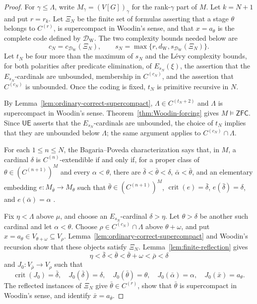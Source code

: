 \documentclass[11pt,a4paper]{amsart}
\newcommand{\ZFC}{\mathsf{ZFC}}
\newcommand{\crit}{\operatorname{crit}}
\newcommand{\UE}{\mathsf{UE}}
\theoremstyle{plain}
\theoremstyle{definition}
\theoremstyle{remark}
\begin{document}
\begin{proof}
For $\gamma\leq\Lambda$, write $M_\gamma=(V[G])_\gamma$ for the rank-$\gamma$ part of $M$.  Let $k=N+1$ and put $r=r_k$.  Let $\Xi_N$ be the finite set of formulas asserting that a stage $\theta$ belongs to $C^{(r)}$, is supercompact in Woodin's sense, and that $x=a_\theta$ is the complete code defined by $\mathcal D_{\mathrm W}$.  The two complexity bounds needed below are
\[
c_N=c_{\mathcal D_{\mathrm W}}(\Xi_N),\qquad
s_N=\max\{r,d_{\mathrm W},s_{\mathcal D_{\mathrm W}}(\Xi_N)\}.
\]
Let $t_N$ be four more than the maximum of $s_N$ and the L\'evy complexity bounds, for both polarities after predicate elimination, of $E_{s_N}(\xi)$, the assertion that the $E_{s_N}$-cardinals are unbounded, membership in $C^{(c_N)}$, and the assertion that $C^{(c_N)}$ is unbounded.  Once the coding is fixed, $t_N$ is primitive recursive in $N$.

By Lemma~\ref{lem:ordinary-correct-supercompact}, $\Lambda\in C^{(t_N+2)}$ and $\Lambda$ is supercompact in Woodin's sense.  Theorem~\ref{thm:Woodin-forcing} gives $M\models\ZFC$.  Since $\UE$ asserts that the $E_{s_N}$-cardinals are unbounded, the choice of $t_N$ implies that they are unbounded below $\Lambda$; the same argument applies to $C^{(c_N)}\cap\Lambda$.

For each $1\leq n\leq N$, the Bagaria--Poveda characterization says that, in $M$, a cardinal $\delta$ is $C^{(n)}$-extendible if and only if, for a proper class of $\theta\in(C^{(n+1)})^M$ and every $\alpha<\theta$, there are $\bar\delta<\bar\theta<\delta$, $\bar\alpha<\bar\theta$, and an elementary embedding $e:M_{\bar\theta}\to M_\theta$ such that $\bar\theta\in(C^{(n+1)})^M$, $\crit(e)=\bar\delta$, $e(\bar\delta)=\delta$, and $e(\bar\alpha)=\alpha$ \cite[Corollary~2.7]{BagariaPoveda}.

Fix $\eta<\Lambda$ above $\mu$, and choose an $E_{s_N}$-cardinal $\delta>\eta$.  Let $\theta>\delta$ be another such cardinal and let $\alpha<\theta$.  Choose $\rho\in C^{(c_N)}\cap\Lambda$ above $\theta+\omega$, and put $x=a_\theta\in V_{\theta+\omega}\subseteq V_\rho$.  Lemma~\ref{lem:ordinary-correct-supercompact} and Woodin's recursion show that these objects satisfy $\Xi_N$.  Lemma~\ref{lem:finite-reflection} gives
\[
\eta<\bar\delta<\bar\theta<\bar\theta+\omega<\bar\rho<\delta
\]
and $J_0:V_{\bar\rho}\to V_\rho$ such that
\[
\crit(J_0)=\bar\delta,\quad J_0(\bar\delta)=\delta,\quad
J_0(\bar\theta)=\theta,\quad J_0(\bar\alpha)=\alpha,
\quad J_0(\bar x)=a_\theta.
\]
The reflected instances of $\Xi_N$ give $\bar\theta\in C^{(r)}$, show that $\bar\theta$ is supercompact in Woodin's sense, and identify $\bar x=a_{\bar\theta}$.


\end{proof}
\end{document}
